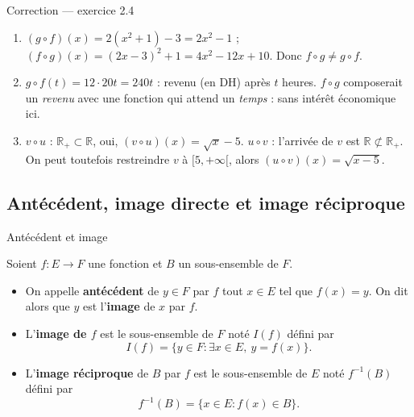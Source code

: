 \documentclass[aspectratio=169,11pt]{beamer}
\newcommand{\R}{\mathbb{R}}
\newcommand{\key}[1]{\textbf{\color{DarkBlue}#1}}
\newcommand{\fonc}[3]{#1\colon #2\to #3}
\begin{document}
\begin{frame}{Correction --- exercice 2.4}
	\begin{definitionbox}[Correction]
		\begin{enumerate}
			\item $(g\circ f)(x)=2(x^2+1)-3=2x^2-1$ ;
			$(f\circ g)(x)=(2x-3)^2+1=4x^2-12x+10$.
			Donc $f\circ g\neq g\circ f$.
			\item $g\circ f(t)=12\cdot 20t=240t$ : revenu (en DH) après $t$ heures.
			$f\circ g$ composerait un \emph{revenu} avec une fonction qui attend un \emph{temps} :
			sans intérêt économique ici.
			\item $v\circ u$ : $\R_+\subset\R$, oui, $(v\circ u)(x)=\sqrt{x}-5$.
			$u\circ v$ : l'arrivée de $v$ est $\R\not\subset\R_+$. On peut toutefois restreindre
			$v$ à $[5,+\infty[$, alors $(u\circ v)(x)=\sqrt{x-5}$.
		\end{enumerate}
	\end{definitionbox}
\end{frame}

\subsection{Antécédent, image directe et image réciproque}

\begin{frame}{Antécédent et image}
	\begin{definitionbox}
		Soient $\fonc{f}{E}{F}$ une fonction et $B$ un sous-ensemble de $F$.
		\begin{itemize}
			\item On appelle \key{antécédent} de $y\in F$ par $f$ tout $x\in E$ tel que $f(x)=y$.
			On dit alors que $y$ est l'\key{image} de $x$ par $f$.
			\item L'\key{image de $f$} est le sous-ensemble de $F$ noté $I(f)$ défini par
			\[
				I(f)=\bigl\{ y\in F : \exists x\in E,\ y=f(x)\bigr\}.
			\]
			\item L'\key{image réciproque} de $B$ par $f$ est le sous-ensemble de $E$ noté
			$f^{-1}(B)$ défini par
			\[
				f^{-1}(B)=\bigl\{ x\in E : f(x)\in B\bigr\}.
			\]
		\end{itemize}
	\end{definitionbox}
\end{frame}
\end{document}
